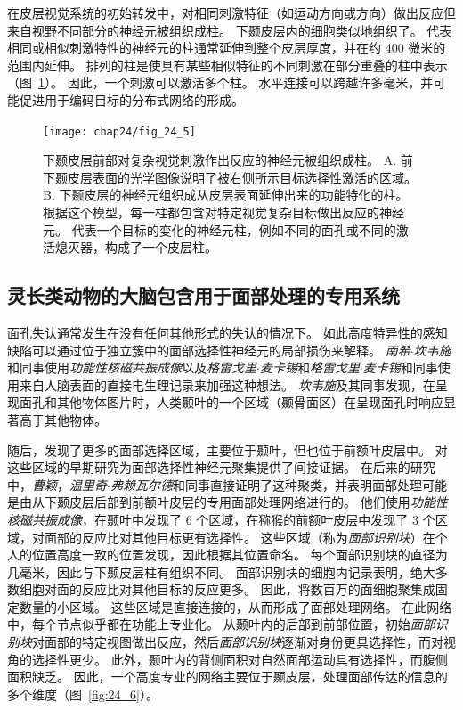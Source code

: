 在皮层视觉系统的初始转发中，对相同刺激特征（如运动方向或方向）做出反应但来自视野不同部分的神经元被组织成柱。
下颞皮层内的细胞类似地组织了。
代表相同或相似刺激特性的神经元的柱通常延伸到整个皮层厚度，并在约 400 微米的范围内延伸。
排列的柱是使具有某些相似特征的不同刺激在部分重叠的柱中表示（图~\ref{fig:24_5}）。
因此，一个刺激可以激活多个柱。
水平连接可以跨越许多毫米，并可能促进用于编码目标的分布式网络的形成。


\begin{figure}[htbp]
	\centering
	\texttt{[image: chap24/fig\_24\_5]}
	\caption{下颞皮层前部对复杂视觉刺激作出反应的神经元被组织成柱。
		A. 前下颞皮层表面的光学图像说明了被右侧所示目标选择性激活的区域。
		B. 下颞皮层的神经元组织成从皮层表面延伸出来的功能特化的柱。
		根据这个模型，每一柱都包含对特定视觉复杂目标做出反应的神经元。
		代表一个目标的变化的神经元柱，例如不同的面孔或不同的激活熄灭器，构成了一个皮层柱。}
	\label{fig:24_5}
\end{figure}



\subsection{灵长类动物的大脑包含用于面部处理的专用系统}

面孔失认通常发生在没有任何其他形式的失认的情况下。
如此高度特异性的感知缺陷可以通过位于独立簇中的面部选择性神经元的局部损伤来解释。
\textit{南希$\cdot$坎韦施}和同事使用\textit{功能性核磁共振成像}以及\textit{格雷戈里$\cdot$麦卡锡}和\textit{格雷戈里$\cdot$麦卡锡}和同事使用来自人脑表面的直接电生理记录来加强这种想法。
\textit{坎韦施}及其同事发现，在呈现面孔和其他物体图片时，人类颞叶的一个区域（颞骨面区）在呈现面孔时响应显著高于其他物体。


随后，发现了更多的面部选择区域，主要位于颞叶，但也位于前额叶皮层中。
对这些区域的早期研究为面部选择性神经元聚集提供了间接证据。
在后来的研究中，\textit{曹颖}，\textit{温里奇$\cdot$弗赖瓦尔德}和同事直接证明了这种聚类，并表明面部处理可能是由从下颞皮层后部到前额叶皮层的专用面部处理网络进行的。
他们使用\textit{功能性核磁共振成像}，在颞叶中发现了 6 个区域，在猕猴的前额叶皮层中发现了 3 个区域，对面部的反应比对其他目标更有选择性。
这些区域（称为\textit{面部识别块}）在个人的位置高度一致的位置发现，因此根据其位置命名。
每个面部识别块的直径为几毫米，因此与下颞皮层柱有组织不同。
面部识别块的细胞内记录表明，绝大多数细胞对面的反应比对其他目标的反应更多。
因此，将数百万的面细胞聚集成固定数量的小区域。
这些区域是直接连接的，从而形成了面部处理网络。
在此网络中，每个节点似乎都在功能上专业化。
从颞叶内的后部到前部位置，初始\textit{面部识别块}对面部的特定视图做出反应，然后\textit{面部识别块}逐渐对身份更具选择性，而对视角的选择性更少。 
此外，颞叶内的背侧面积对自然面部运动具有选择性，而腹侧面积缺乏。
因此，一个高度专业的网络主要位于颞皮层，处理面部传达的信息的多个维度（图~\ref{fig:24_6}）。


